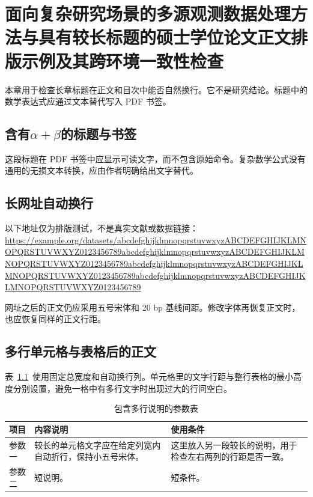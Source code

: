 \documentclass[degree-type=professional,bibliography=none]{gzuthesis}
\begin{document}
\frontmatter
\tableofcontents
\mainmatter
\chapter{面向复杂研究场景的多源观测数据处理方法与具有较长标题的硕士学位论文正文排版示例及其跨环境一致性检查}
本章用于检查长章标题在正文和目次中能否自然换行。它不是研究结论。标题中的数学表达式应通过文本替代写入 PDF 书签。
\section{含有\texorpdfstring{$\alpha+\beta$}{alpha + beta}的标题\quad 与书签}
这段标题在 PDF 书签中应显示可读文字，而不包含原始命令。复杂数学公式没有通用的无损文本转换，应由作者明确给出文字替代。

\section{长网址自动换行}
以下地址仅为排版测试，不是真实文献或数据链接：
\url{https://example.org/datasets/abcdefghijklmnopqrstuvwxyzABCDEFGHIJKLMNOPQRSTUVWXYZ0123456789abcdefghijklmnopqrstuvwxyzABCDEFGHIJKLMNOPQRSTUVWXYZ0123456789abcdefghijklmnopqrstuvwxyzABCDEFGHIJKLMNOPQRSTUVWXYZ0123456789abcdefghijklmnopqrstuvwxyzABCDEFGHIJKLMNOPQRSTUVWXYZ0123456789}

网址之后的正文仍应采用五号宋体和 20 bp 基线间距。修改字体再恢复正文时，\texttt{\string\normalsize} 也应恢复同样的正文行距。

\section{多行单元格与表格后的正文}
表~\ref{tab:wrapping}~使用固定总宽度和自动换行列。单元格里的文字行距与整行表格的最小高度分别设置，避免一格中有多行文字时出现过大的行间空白。
\begin{table}
  \centering
  \caption{包含多行说明的参数表}
  \label{tab:wrapping}
  \begin{tabularx}{\linewidth}{l>{\raggedright\arraybackslash}X>{\raggedright\arraybackslash}X}
    \toprule
    项目 & 内容说明 & 使用条件 \\
    \midrule
    参数一 & 较长的单元格文字应在给定列宽内自动折行，保持小五号宋体。 & 这里放入另一段较长的说明，用于检查左右两列的行距是否一致。 \\
    参数二 & 短说明。 & 短条件。 \\
    \bottomrule
  \end{tabularx}
\end{table}
\end{document}
